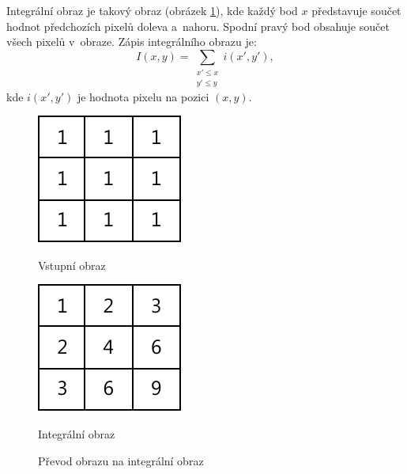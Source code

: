 Integrální obraz je takový obraz (obrázek \ref{fig:integralimage}), kde každý bod $x$ představuje součet hodnot předchozích pixelů doleva a~nahoru. Spodní pravý bod obsahuje součet všech pixelů v~obraze.
Zápis integrálního obrazu je:
\begin{equation*}
\label{integralimage}
 I(x, y) = \sum_{\substack{x' \leq x \\ y' \leq y}}{} i(x', y'),
\end{equation*}
kde $i(x', y')$ je hodnota pixelu na pozici $(x, y)$.
\begin{figure}[H]
\centering
\begin{minipage}{.4\textwidth}
  \centering
  \includegraphics[width=.5\linewidth]{figures/ii_input}
  \caption*{Vstupní obraz}
  \label{fig:ii_input}
\end{minipage}%
\begin{minipage}{.4\textwidth}
  \centering
  \includegraphics[width=.5\linewidth]{figures/ii_output}
  \caption*{Integrální obraz}
  \label{fig:ii_output}
\end{minipage}
\caption{Převod obrazu na integrální obraz}
\label{fig:integralimage}
\end{figure}


